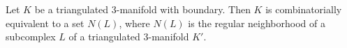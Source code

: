 Let $K$ be a triangulated 3-manifold with boundary. Then $K$ is combinatorially equivalent to a set $N(L)$, where $N(L)$ is the regular neighborhood of a subcomplex $L$ of a triangulated 3-manifold $K'$.
